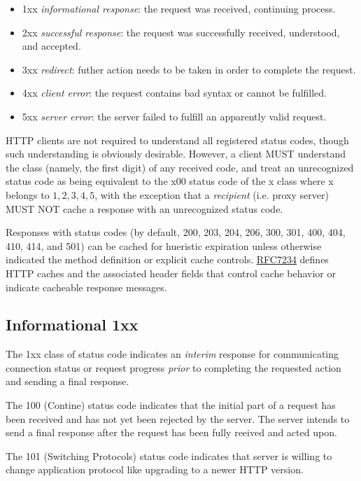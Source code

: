\begin{itemize}
\item 1xx \textit{informational response}: the request was
  received, continuing process.
\item 2xx \textit{successful response}: the request was
  successfully received, understood, and accepted.
\item 3xx \textit{redirect}: futher action needs to be taken in
  order to complete the request.
\item 4xx \textit{client error}: the request contains bad syntax
  or cannot be fulfilled.
\item 5xx \textit{server error}: the server failed to fulfill an
  apparently valid request.
\end{itemize}

HTTP clients are not required to understand all registered status
codes, though such understanding is obviously desirable. However,
a client MUST understand the class (namely, the first digit) of
any received code, and treat an unrecognized status code as being
equivalent to the x00 status code of the x class where x belongs
to ${1,2,3,4,5}$, with the exception that a \textit{recipient}
(i.e. proxy server) MUST NOT cache a response with an unrecognized
status code.

Responses with status codes (by default, 200, 203, 204, 206, 300,
301, 400, 404, 410, 414, and 501) can be cached for hueristic
expiration unless otherwise indicated the method definition or
explicit cache
controls. \href{https://tools.ietf.org/html/rfc7234}{RFC7234}
defines HTTP caches and the associated header fields that control
cache behavior or indicate cacheable response messages.

\subsection{Informational 1xx}
\label{sec:informational-1xx}

The 1xx class of status code indicates an \textit{interim}
response for communicating connection status or request progress
\textit{prior} to completing the requested action and sending a
final response.

The 100 (Contine) status code indicates that the initial part of a
request has been received and has not yet been rejected by the
server. The server intends to send a final response after the
request has been fully reeived and acted upon.

The 101 (Switching Protocols) status code indicates that server is
willing to change application protocol like upgrading to a newer
HTTP version.

